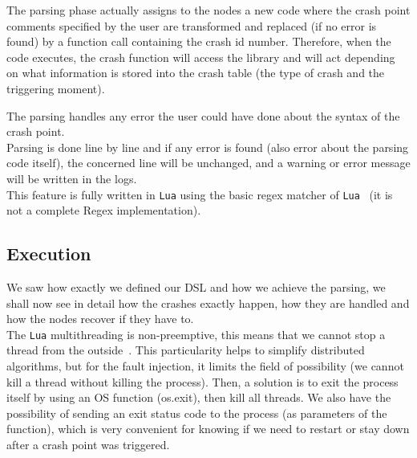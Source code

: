 \documentclass{eplmastersthesis}
\begin{document}
        The parsing phase actually assigns to the nodes a new code where the
        crash point comments specified by the user are transformed and
        replaced (if no error is found) by a function call containing the
        crash id number. Therefore, when the code executes, the crash
        function will access the library and will act depending on what
        information is stored into the crash table (the type of crash and
        the triggering moment).

        The parsing handles any error the user could have done about the
        syntax of the crash point.\\
        Parsing is done line by line and if any error is found (also error
        about the parsing code itself), the concerned line will be unchanged, and
        a warning or error message will be written in the logs.\\
        This feature is fully written in \texttt{Lua} using the basic regex matcher
        of \texttt{Lua}~\cite{RegexLua} (it is not a complete Regex implementation).

      \subsection{Execution}

        We saw how exactly we defined our DSL and how we achieve the parsing,
        we shall now see in detail how the crashes exactly happen, how they
        are handled and how the nodes recover if they have to.\\

        The \texttt{Lua} multithreading is non-preemptive, this means that we cannot stop a thread from the
        outside~\cite{CoroutineLua}. This particularity helps to simplify distributed algorithms,
        but for the fault injection, it limits the field of possibility
        (we cannot kill a thread without killing the process).
        Then, a solution is to exit the process itself by using an OS function (os.exit),
        then kill all threads. We also have the possibility of sending an exit
        status code to the process (as parameters of the function),
        which is very convenient for knowing if we need to restart or stay
        down after a crash point was triggered.\\
\end{document}
